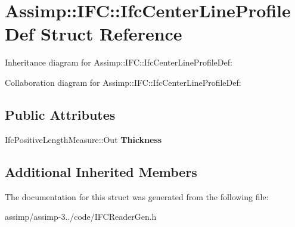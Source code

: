 \hypertarget{struct_assimp_1_1_i_f_c_1_1_ifc_center_line_profile_def}{\section{Assimp\+:\+:I\+F\+C\+:\+:Ifc\+Center\+Line\+Profile\+Def Struct Reference}
\label{struct_assimp_1_1_i_f_c_1_1_ifc_center_line_profile_def}
}


Inheritance diagram for Assimp\+:\+:I\+F\+C\+:\+:Ifc\+Center\+Line\+Profile\+Def\+:


Collaboration diagram for Assimp\+:\+:I\+F\+C\+:\+:Ifc\+Center\+Line\+Profile\+Def\+:
\subsection*{Public Attributes}
\begin{DoxyCompactItemize}
\item 
\hypertarget{struct_assimp_1_1_i_f_c_1_1_ifc_center_line_profile_def_ae7ab10cc7e62fd661e21fdc760eb0e25}{Ifc\+Positive\+Length\+Measure\+::\+Out {\bfseries Thickness}}\label{struct_assimp_1_1_i_f_c_1_1_ifc_center_line_profile_def_ae7ab10cc7e62fd661e21fdc760eb0e25}

\end{DoxyCompactItemize}
\subsection*{Additional Inherited Members}


The documentation for this struct was generated from the following file\+:\begin{DoxyCompactItemize}
\item 
assimp/assimp-\/3../code/I\+F\+C\+Reader\+Gen.\+h\end{DoxyCompactItemize}
